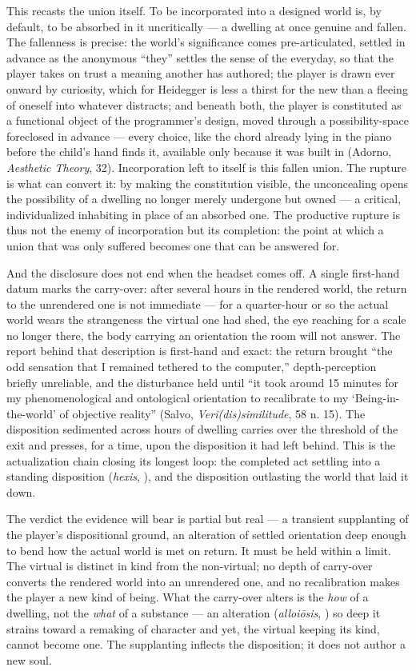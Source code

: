 This recasts the union itself. To be incorporated into a designed world is, by default, to be absorbed in it uncritically — a dwelling at once genuine and fallen. The fallenness is precise: the world's significance comes pre-articulated, settled in advance as the anonymous ``they'' settles the sense of the everyday, so that the player takes on trust a meaning another has authored; the player is drawn ever onward by curiosity, which for Heidegger is less a thirst for the new than a fleeing of oneself into whatever distracts; and beneath both, the player is constituted as a functional object of the programmer's design, moved through a possibility-space foreclosed in advance — every choice, like the chord already lying in the piano before the child's hand finds it, available only because it was built in (Adorno, \textit{Aesthetic Theory}, 32). Incorporation left to itself is this fallen union. The rupture is what can convert it: by making the constitution visible, the unconcealing opens the possibility of a dwelling no longer merely undergone but owned — a critical, individualized inhabiting in place of an absorbed one. The productive rupture is thus not the enemy of incorporation but its completion: the point at which a union that was only suffered becomes one that can be answered for.

And the disclosure does not end when the headset comes off. A single first-hand datum marks the carry-over: after several hours in the rendered world, the return to the unrendered one is not immediate — for a quarter-hour or so the actual world wears the strangeness the virtual one had shed, the eye reaching for a scale no longer there, the body carrying an orientation the room will not answer. The report behind that description is first-hand and exact: the return brought ``the odd sensation that I remained tethered to the computer,'' depth-perception briefly unreliable, and the disturbance held until ``it took around 15 minutes for my phenomenological and ontological orientation to recalibrate to my `Being-in-the-world' of objective reality'' (Salvo, \textit{Veri(dis)similitude}, 58 n. 15). The disposition sedimented across hours of dwelling carries over the threshold of the exit and presses, for a time, upon the disposition it had left behind. This is the actualization chain closing its longest loop: the completed act settling into a standing disposition (\textit{hexis}, ), and the disposition outlasting the world that laid it down.

The verdict the evidence will bear is partial but real — a transient supplanting of the player's dispositional ground, an alteration of settled orientation deep enough to bend how the actual world is met on return. It must be held within a limit. The virtual is distinct in kind from the non-virtual; no depth of carry-over converts the rendered world into an unrendered one, and no recalibration makes the player a new kind of being. What the carry-over alters is the \textit{how} of a dwelling, not the \textit{what} of a substance — an alteration (\textit{alloiōsis}, ) so deep it strains toward a remaking of character and yet, the virtual keeping its kind, cannot become one. The supplanting inflects the disposition; it does not author a new soul.


